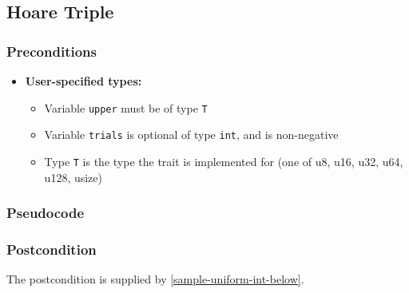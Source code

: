 \documentclass{article}
\begin{document}
\subsection{Hoare Triple}
\subsubsection*{Preconditions}
\begin{itemize}
    \item \textbf{User-specified types:}
    \begin{itemize}
        \item Variable \texttt{upper} must be of type \texttt{T}
        \item Variable \texttt{trials} is optional of type \texttt{int}, and is non-negative
        \item Type \texttt{T} is the type the trait is implemented for (one of u8, u16, u32, u64, u128, usize)
    \end{itemize}
\end{itemize}

\subsubsection*{Pseudocode}



\subsubsection*{Postcondition}
The postcondition is supplied by \ref{sample-uniform-int-below}.
\end{document}
